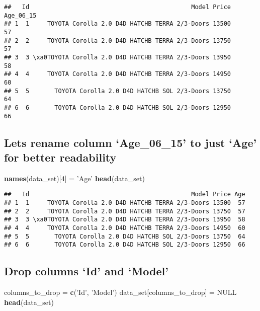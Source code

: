 \documentclass[]{article}
\newenvironment{Shaded}{\begin{snugshade}}{\end{snugshade}}
\newcommand{\DecValTok}[1]{\textcolor[rgb]{0.00,0.00,0.81}{#1}}
\newcommand{\KeywordTok}[1]{\textcolor[rgb]{0.13,0.29,0.53}{\textbf{#1}}}
\newcommand{\NormalTok}[1]{#1}
\newcommand{\OtherTok}[1]{\textcolor[rgb]{0.56,0.35,0.01}{#1}}
\newcommand{\StringTok}[1]{\textcolor[rgb]{0.31,0.60,0.02}{#1}}
\begin{document}
\begin{verbatim}
##   Id                                             Model Price Age_06_15
## 1  1     TOYOTA Corolla 2.0 D4D HATCHB TERRA 2/3-Doors 13500        57
## 2  2     TOYOTA Corolla 2.0 D4D HATCHB TERRA 2/3-Doors 13750        57
## 3  3 \xa0TOYOTA Corolla 2.0 D4D HATCHB TERRA 2/3-Doors 13950        58
## 4  4     TOYOTA Corolla 2.0 D4D HATCHB TERRA 2/3-Doors 14950        60
## 5  5       TOYOTA Corolla 2.0 D4D HATCHB SOL 2/3-Doors 13750        64
## 6  6       TOYOTA Corolla 2.0 D4D HATCHB SOL 2/3-Doors 12950        66
\end{verbatim}

\hypertarget{lets-rename-column-age_06_15-to-just-age-for-better-readability}{%
\subsection{Lets rename column `Age\_06\_15' to just `Age' for better
readability}\label{lets-rename-column-age_06_15-to-just-age-for-better-readability}}

\begin{Shaded}
\begin{Highlighting}[]
\KeywordTok{names}\NormalTok{(data_set)[}\DecValTok{4}\NormalTok{] =}\StringTok{ 'Age'}
\KeywordTok{head}\NormalTok{(data_set)}
\end{Highlighting}
\end{Shaded}

\begin{verbatim}
##   Id                                             Model Price Age
## 1  1     TOYOTA Corolla 2.0 D4D HATCHB TERRA 2/3-Doors 13500  57
## 2  2     TOYOTA Corolla 2.0 D4D HATCHB TERRA 2/3-Doors 13750  57
## 3  3 \xa0TOYOTA Corolla 2.0 D4D HATCHB TERRA 2/3-Doors 13950  58
## 4  4     TOYOTA Corolla 2.0 D4D HATCHB TERRA 2/3-Doors 14950  60
## 5  5       TOYOTA Corolla 2.0 D4D HATCHB SOL 2/3-Doors 13750  64
## 6  6       TOYOTA Corolla 2.0 D4D HATCHB SOL 2/3-Doors 12950  66
\end{verbatim}

\hypertarget{drop-columns-id-and-model}{%
\subsection{Drop columns `Id' and
`Model'}\label{drop-columns-id-and-model}}

\begin{Shaded}
\begin{Highlighting}[]
\NormalTok{columns_to_drop =}\StringTok{ }\KeywordTok{c}\NormalTok{(}\StringTok{'Id'}\NormalTok{, }\StringTok{'Model'}\NormalTok{)}
\NormalTok{data_set[columns_to_drop] =}\StringTok{ }\OtherTok{NULL}
\KeywordTok{head}\NormalTok{(data_set)}
\end{Highlighting}
\end{Shaded}
\end{document}
